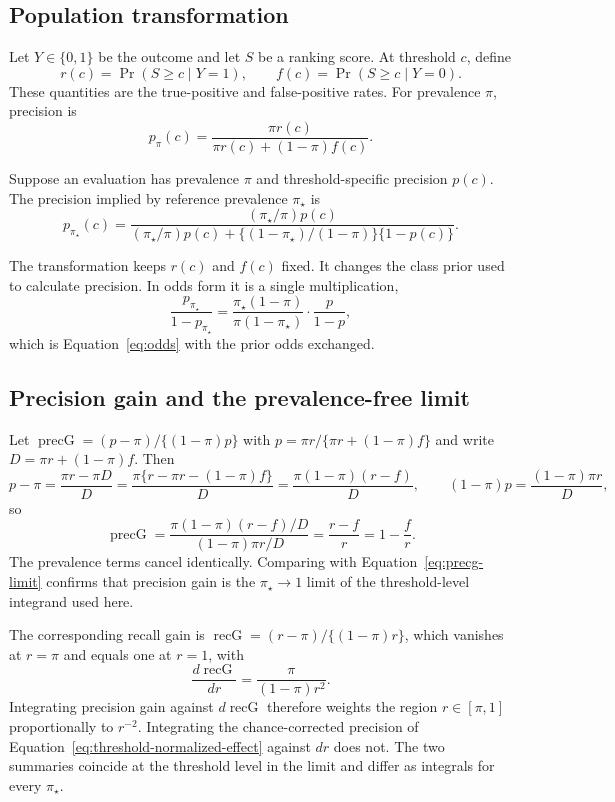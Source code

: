 \documentclass[11pt]{article}
\theoremstyle{remark}
\begin{document}
\subsection{Population transformation}

Let $Y\in\{0,1\}$ be the outcome and let $S$ be a ranking score. At threshold $c$, define
\[
r(c)=\Pr(S\geq c\mid Y=1),
\qquad
f(c)=\Pr(S\geq c\mid Y=0).
\]
These quantities are the true-positive and false-positive rates. For prevalence $\pi$, precision is
\[
p_{\pi}(c)
=
\frac{\pi r(c)}{\pi r(c)+(1-\pi)f(c)}.
\]

Suppose an evaluation has prevalence $\pi$ and threshold-specific precision $p(c)$. The precision implied by reference prevalence $\pi_\star$ is
\begin{equation}
p_{\pi_\star}(c)
=
\frac{(\pi_\star/\pi)p(c)}
{(\pi_\star/\pi)p(c)
+
\{(1-\pi_\star)/(1-\pi)\}\{1-p(c)\}}.
\label{eq:precision-transform}
\end{equation}

The transformation keeps $r(c)$ and $f(c)$ fixed. It changes the class prior used to calculate precision. In odds form it is a single multiplication,
\[
\frac{p_{\pi_\star}}{1-p_{\pi_\star}}
=
\frac{\pi_\star(1-\pi)}{\pi(1-\pi_\star)}
\cdot
\frac{p}{1-p},
\]
which is Equation~\eqref{eq:odds} with the prior odds exchanged.

\subsection{Precision gain and the prevalence-free limit}
\label{app:precg}

Let $\operatorname{precG}=(p-\pi)/\{(1-\pi)p\}$ with $p=\pi r/\{\pi r+(1-\pi)f\}$ and write $D=\pi r+(1-\pi)f$. Then
\[
p-\pi
=
\frac{\pi r-\pi D}{D}
=
\frac{\pi\{r-\pi r-(1-\pi)f\}}{D}
=
\frac{\pi(1-\pi)(r-f)}{D},
\qquad
(1-\pi)p
=
\frac{(1-\pi)\pi r}{D},
\]
so
\[
\operatorname{precG}
=
\frac{\pi(1-\pi)(r-f)/D}{(1-\pi)\pi r/D}
=
\frac{r-f}{r}
=
1-\frac{f}{r}.
\]
The prevalence terms cancel identically. Comparing with Equation~\eqref{eq:precg-limit} confirms that precision gain is the $\pi_\star\to1$ limit of the threshold-level integrand used here.

The corresponding recall gain is $\operatorname{recG}=(r-\pi)/\{(1-\pi)r\}$, which vanishes at $r=\pi$ and equals one at $r=1$, with
\[
\frac{d\operatorname{recG}}{dr}
=
\frac{\pi}{(1-\pi)r^{2}} .
\]
Integrating precision gain against $d\operatorname{recG}$ therefore weights the region $r\in[\pi,1]$ proportionally to $r^{-2}$. Integrating the chance-corrected precision of Equation~\eqref{eq:threshold-normalized-effect} against $dr$ does not. The two summaries coincide at the threshold level in the limit and differ as integrals for every $\pi_\star$.
\end{document}
